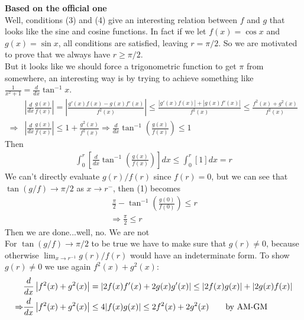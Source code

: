 \begin{solution}[$\pi/2$]
    \textbf{Based on the official one}\\
   Well, conditions (3) and (4) give an interesting relation between $f$ and $g$ that looks like the sine and cosine functions. In fact if we let $f(x)=\cos x$ and $g(x) = \sin x$, all conditions are satisfied, leaving $r=\pi /2$. So we are motivated to prove that we always have $r \geq \pi / 2$.\\
   But it looks like we should force a trigonometric function to get $\pi$ from somewhere, an interesting way is by trying to achieve something like $\frac{1}{x^2+1}=\frac{d}{dx}\tan^{-1}x$.\\ \vspace{5pt}
   \begin{align*}
        &\left | \frac{d}{dx} \frac{g(x)}{f(x)} \right |= \left |\frac{g'(x)f(x)-   g(x)f'(x)}{f^2(x)}\right | \leq \frac{|g'(x)f(x)|+|g(x)f'(x)|}{f^2(x)} \leq \frac{f^2(x)+g^2(x)}{f^2(x)} \\
        \Rightarrow &\left | \frac{d}{dx} \frac{g(x)}{f(x)} \right | \leq 1+\frac{g^2(x)}{f^2(x)} \Rightarrow \frac{d}{dx}\tan^{-1} \left( \frac{g(x)}{f(x)} \right ) \leq 1
    \end{align*}
    Then 
    \begin{align}
        \int_0^r \left[\frac{d}{dx}\tan^{-1} \left( \frac{g(x)}{f(x)} \right )\right]dx \leq \int_0^r [1] dx = r
    \end{align}
    We can't directly evaluate $g(r)/f(r)$ since $f(r)=0$, but we can see that $\tan (g/f) \rightarrow \pi/2$ as $x \rightarrow r^-$, then (1) becomes
    \begin{align*}
        \ \frac{\pi}{2} - \tan^{-1} \left( \frac{g(0)}{f(0)} \right ) \leq r \\
        \Rightarrow \frac{\pi}{2} \leq r
    \end{align*}
    Then we are done...well, no. We are not\\
    For $\tan (g/f) \rightarrow \pi/2$ to be true we have to make sure that $g(r) \neq 0$, because otherwise $\lim_{x \rightarrow r^{-1}}g(r)/f(r)$ would have an indeterminate form. To show $g(r) \neq 0$ we use again $f^2(x)+g^2(x)$:\\
    \begin{align*}
        &\frac{d}{dx} \left | f^2(x)+g^2(x) \right| = |2f(x)f'(x)+2g(x)g'(x)| \leq |2f(x)g(x)| + |2g(x)f(x)| \\
        \Rightarrow&\frac{d}{dx} \left | f^2(x)+g^2(x) \right| \leq 4|f(x)g(x)| \leq 2f^2(x)+2g^2(x) \text{\hspace{20pt}by AM-GM}\\

\end{align*}
\end{solution}
